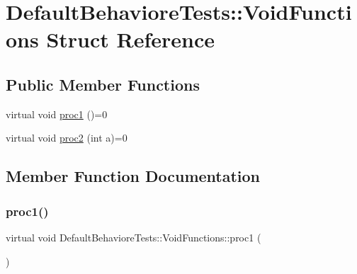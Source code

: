 \hypertarget{structDefaultBehavioreTests_1_1VoidFunctions}{}\section{Default\+Behaviore\+Tests\+::Void\+Functions Struct Reference}
\label{structDefaultBehavioreTests_1_1VoidFunctions}
\subsection*{Public Member Functions}
\begin{DoxyCompactItemize}
\item 
virtual void \mbox{\hyperlink{structDefaultBehavioreTests_1_1VoidFunctions_abb43ae56488622289e7997383ea4c5e6}{proc1}} ()=0
\item 
virtual void \mbox{\hyperlink{structDefaultBehavioreTests_1_1VoidFunctions_a7c96ee1999f2e0b36a72016aa03a5240}{proc2}} (int a)=0
\end{DoxyCompactItemize}


\subsection{Member Function Documentation}
\mbox{\label{structDefaultBehavioreTests_1_1VoidFunctions_abb43ae56488622289e7997383ea4c5e6}} 
\subsubsection{\texorpdfstring{proc1()}{proc1()}}
{\footnotesize\ttfamily virtual void Default\+Behaviore\+Tests\+::\+Void\+Functions\+::proc1 (\begin{DoxyParamCaption}{ }\end{DoxyParamCaption})\hspace{0.3cm}{\ttfamily [pure virtual]}}

\mbox{\label{structDefaultBehavioreTests_1_1VoidFunctions_a7c96ee1999f2e0b36a72016aa03a5240}} 
